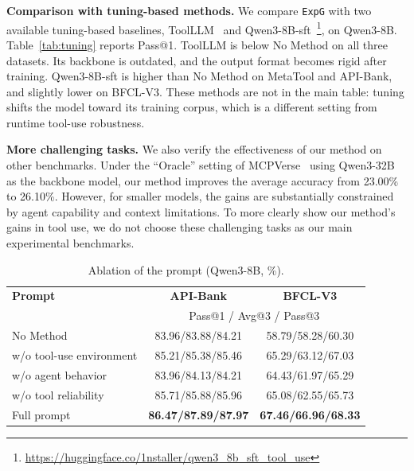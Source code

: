 \documentclass[11pt]{article}
\newcommand{\ours}{\texttt{ExpG}}
\begin{document}
\textbf{Comparison with tuning-based methods.}
We compare {\ours} with two available tuning-based baselines, ToolLLM~\cite{11} and Qwen3-8B-sft~\footnote{\url{https://huggingface.co/1nstaller/qwen3_8b_sft_tool_use}}, on Qwen3-8B. Table~\ref{tab:tuning} reports Pass@1. ToolLLM is below No Method on all three datasets. Its backbone is outdated, and the output format becomes rigid after training. Qwen3-8B-sft is higher than No Method on MetaTool and API-Bank, and slightly lower on BFCL-V3. These methods are not in the main table: tuning shifts the model toward its training corpus, which is a different setting from runtime tool-use robustness.

\textbf{More challenging tasks.}
We also verify the effectiveness of our method on other benchmarks. Under the ``Oracle'' setting of MCPVerse~\cite{lei2025mcpverse} using Qwen3-32B as the backbone model, our method improves the average accuracy from 23.00\% to 26.10\%. However, for smaller models, the gains are substantially constrained by agent capability and context limitations. To more clearly show our method's gains in tool use, we do not choose these challenging tasks as our main experimental benchmarks.

\begin{table}[t]
\caption{Ablation of the prompt (Qwen3-8B, \%).}
\vspace{-1mm}
\centering
\fontsize{8}{9}\selectfont
\setlength{\tabcolsep}{2pt}
\begin{tabular*}{\columnwidth}{@{\extracolsep{\fill}}lcc@{}}
\toprule
\textbf{Prompt} & \textbf{API-Bank} & \textbf{BFCL-V3} \\
& \multicolumn{2}{c}{Pass@1 / Avg@3 / Pass@3} \\
\midrule
No Method & 83.96/83.88/84.21 & 58.79/58.28/60.30 \\
w/o tool-use environment & 85.21/85.38/85.46 & 65.29/63.12/67.03 \\
w/o agent behavior & 83.96/84.13/84.21 & 64.43/61.97/65.29 \\
w/o tool reliability & 85.71/85.88/85.96 & 65.08/62.55/65.73 \\
Full prompt & \textbf{86.47/87.89/87.97} & \textbf{67.46/66.96/68.33} \\
\bottomrule
\end{tabular*}
\label{tab:score_groups}
\vspace{-2mm}
\end{table}
\end{document}
